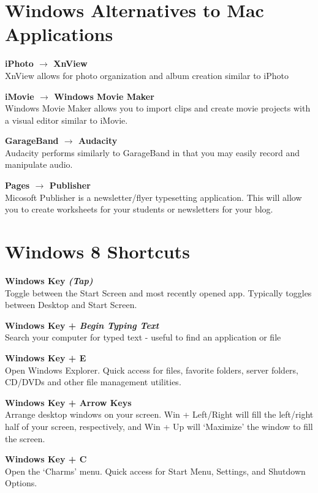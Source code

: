 \documentclass[10pt,foldmark,notumble]{leaflet}
\begin{document}

\section{Windows Alternatives to Mac Applications\color{red}\hrulefill\color{black}}
\textbf{iPhoto $\to$ XnView}\\
XnView allows for photo organization and album creation similar to iPhoto

\textbf{iMovie $\to$ Windows Movie Maker}\\
Windows Movie Maker allows you to import clips and create movie projects with a visual editor similar to iMovie.

\textbf{GarageBand $\to$ Audacity}\\
Audacity performs similarly to GarageBand in that you may easily record and manipulate audio.

\textbf{Pages $\to$ Publisher}\\
Micosoft Publisher is a newsletter/flyer typesetting application. This will allow you to create worksheets for your students or newsletters for your blog.

\section{Windows 8 Shortcuts\color{red}\hrulefill\color{black}}
\textbf{Windows Key \emph{(Tap)}}\\
Toggle between the Start Screen and most recently opened app. Typically toggles between Desktop and Start Screen.

\textbf{Windows Key + \emph{Begin Typing Text}}\\
Search your computer for typed text - useful to find an application or file

\textbf{Windows Key + E}\\
Open Windows Explorer. Quick access for files, favorite folders, server folders, CD/DVDs and other file management utilities.

\textbf{Windows Key + Arrow Keys}\\
Arrange desktop windows on your screen. Win + Left/Right will fill the left/right half of your screen, respectively, and Win + Up will `Maximize' the window to fill the screen.

\textbf{Windows Key + C}\\
Open the `Charms' menu. Quick access for Start Menu, Settings, and Shutdown Options.
\end{document}
